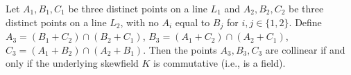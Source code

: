 Let $A_1, B_1, C_1$ be three distinct points on a line $L_1$ and $A_2, B_2, C_2$ be three distinct points on a line $L_2$, with no $A_i$ equal to $B_j$ for $i,j \in \{1,2\}$. Define $A_3 = (B_1 + C_2) \cap (B_2 + C_1)$, $B_3 = (A_1 + C_2) \cap (A_2 + C_1)$, $C_3 = (A_1 + B_2) \cap (A_2 + B_1)$. Then the points $A_3, B_3, C_3$ are collinear if and only if the underlying skewfield $K$ is commutative (i.e., is a field).
